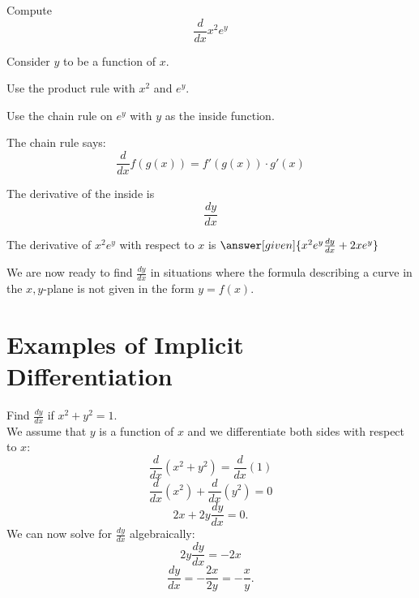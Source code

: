 \documentclass{ximera}
\begin{document}
\begin{problem} %
  Compute
  \[
  \frac{d}{dx} x^2e^y
  \]
  
	  
    \begin{hint}
      Consider $y$ to be a function of $x$.
    \end{hint}
		\begin{hint}
      Use the product rule with $x^2$ and $e^y$.
    \end{hint}
    \begin{hint}
      Use the chain rule on $e^y$ with $y$ as the inside function.
    \end{hint}
    \begin{hint}
      The chain rule says:
      \[
      \frac{d}{dx} f(g(x)) = f'(g(x))\cdot g'(x)
      \]
    \end{hint}
    \begin{hint}
      The derivative of the inside is 
      \[
      \frac{dy}{dx}
      \]
    \end{hint}
    
		The derivative of $x^2 e^y$ with respect to $x$ is
		 $\answer[given]{x^2 e^y \frac{dy}{dx} + 2xe^y}$
		
\end{problem}







We are now ready to find $\frac{dy}{dx}$ in situations where the formula describing a curve in the $x,y$-plane 
is not given in the form $y = f(x)$.

\section{Examples of Implicit Differentiation}


\begin{example} %
Find $\displaystyle{\frac{dy}{dx}}$ if $x^2 + y^2 = 1$.\\
We assume that $y$ is a 
function of $x$ and we differentiate both 
sides with respect to $x$:
\[\frac{d}{dx}(x^2 + y^2)  = \frac{d}{dx} (1) \]
\[\frac{d}{dx}(x^2) + \frac{d}{dx} (y^2) = 0\]
\[2x + 2y\frac{dy}{dx} = 0.\]
We can now solve for $\displaystyle{\frac{dy}{dx}}$ algebraically:
\[2y\frac{dy}{dx} = -2x\]
\[\frac{dy}{dx} = -\frac{2x}{2y}= -\frac{x}{y}.\]
\end{example}



\begin{center}
\begin{foldable}
\end{foldable}
\end{center}
\end{document}
